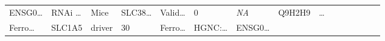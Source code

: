 \documentclass[
]{article}
\begin{document}
\begin{longtable}[]{@{}lllllllllllllll@{}}
\begin{minipage}[t]{0.05\columnwidth}
ENSG0\ldots{}\strut
\end{minipage} & \begin{minipage}[t]{0.05\columnwidth}\raggedright
RNAi \ldots{}\strut
\end{minipage} & \begin{minipage}[t]{0.05\columnwidth}\raggedright
Mice\strut
\end{minipage} & \begin{minipage}[t]{0.05\columnwidth}\raggedright
SLC38\ldots{}\strut
\end{minipage} & \begin{minipage}[t]{0.05\columnwidth}\raggedright
Valid\ldots{}\strut
\end{minipage} & \begin{minipage}[t]{0.05\columnwidth}\raggedright
0\strut
\end{minipage} & \begin{minipage}[t]{0.05\columnwidth}\raggedright
\emph{NA}\strut
\end{minipage} & \begin{minipage}[t]{0.05\columnwidth}\raggedright
Q9H2H9\strut
\end{minipage} & \begin{minipage}[t]{0.02\columnwidth}\raggedright
\ldots{}\strut
\end{minipage}\tabularnewline
\begin{minipage}[t]{0.05\columnwidth}\raggedright
Ferro\ldots{}\strut
\end{minipage} & \begin{minipage}[t]{0.05\columnwidth}\raggedright
SLC1A5\strut
\end{minipage} & \begin{minipage}[t]{0.04\columnwidth}\raggedright
driver\strut
\end{minipage} & \begin{minipage}[t]{0.02\columnwidth}\raggedright
30\strut
\end{minipage} & \begin{minipage}[t]{0.05\columnwidth}\raggedright
Ferro\ldots{}\strut
\end{minipage} & \begin{minipage}[t]{0.05\columnwidth}\raggedright
HGNC:\ldots{}\strut
\end{minipage} & \begin{minipage}[t]{0.05\columnwidth}\raggedright
ENSG0\ldots{}\strut
\end{minipage} & \begin{minipage}[t]{0.05\columnwidth}\raggedright

\end{minipage}
\end{longtable}
\end{document}
